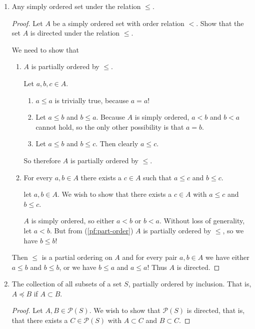 \documentclass[12pt]{article}
\begin{document}
\begin{enumerate}
	\item Any simply ordered set under the relation $\leq$.
	      \begin{proof}
		      Let $A$ be a simply ordered set with order relation $<$. Show that the set $A$ is
		      directed under the relation $\leq$.

		      We need to show that
		      \begin{enumerate}
			      \item\label{pf:part-order} $A$ is partially ordered by $\leq$.

			            Let $a, b, c \in A$.
			            \begin{enumerate}
				            \item $a \leq a$ is trivially true, because $a = a$!
				            \item Let $a \leq b$ and $b \leq a$. Because $A$ is simply ordered, $a
					                  < b$ and $b < a$ cannot hold, so the only other possibility is that $a = b$.
				            \item Let $a \leq b$ and $b \leq c$. Then clearly $a \leq c$.
			            \end{enumerate}
			            So therefore $A$ is partially ordered by $\leq$.
			      \item\label{pf:part-directed} For every $a, b \in A$ there exists a $c \in A$
			            such that $a \leq c$ and $b \leq c$.

			            let $a, b \in A$. We wish to show that there exists a $c \in A$ with $a
				            \leq c$ and $b \leq c$.

			            $A$ is simply ordered, so either $a < b$ or $b < a$. Without loss of
			            generality, let $a < b$. But from (\ref{pf:part-order}) $A$ is partially ordered by $\leq$, so we
			            have $b \leq b$!
		      \end{enumerate}
		      Then $\leq$ is a partial ordering on $A$ and for every pair $a, b \in A$ we have
		      either $a \leq b$ and $b \leq b$, or we have $b \leq a$ and $a \leq a$! Thus $A$ is directed.
	      \end{proof}

	\item The collection of all subsets of a set $S$, partially ordered by inclusion. That is, $A
		      \preceq B$ if $A \subset B$.
	      \begin{proof}
		      Let $A, B \in \mathcal P(S)$. We wish to show that $\mathcal P(S)$ is directed, that
		      is, that there exists a $C \in \mathcal P(S)$ with $A \subset C$ and $B \subset C$.
	      \end{proof}


\end{enumerate}
\end{document}
